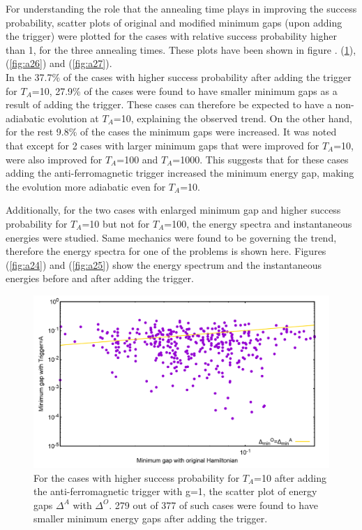 \documentclass[../main.tex]{subfiles}
\begin{document}
For understanding the role that the annealing time plays in improving the success probability, scatter plots of original and modified minimum gaps (upon adding the trigger) were plotted for the cases with relative success probability higher than 1, for the three annealing times. These plots have been shown in figure .
(\ref{fig:a23}), (\ref{fig:a26}) and (\ref{fig:a27}).\\

In the 37.7\% of the cases with higher success probability after adding the trigger for $T_A$=10, 27.9\% of the cases were found to have smaller minimum gaps as a result of adding the trigger. These cases can therefore be expected to have a non-adiabatic evolution at $T_A$=10, explaining the observed trend. On the other hand, for the rest 9.8\% of the cases the minimum gaps were increased. It was noted that except for 2 cases with larger minimum gaps that were improved for $T_A$=10, were also improved for $T_A$=100 and $T_A$=1000. This suggests that for these cases adding the anti-ferromagnetic trigger increased the minimum energy gap, making the evolution more adiabatic even for $T_A$=10. 

Additionally, for the two cases with enlarged minimum gap and higher success probability for $T_A$=10 but not for $T_A$=100, the energy spectra and instantaneous energies were studied. Same mechanics were found to be governing the trend, therefore the energy spectra for one of the problems is shown here. Figures (\ref{fig:a24}) and (\ref{fig:a25}) show the energy spectrum and the instantaneous energies before and after adding the trigger.

\begin{figure}[H]
\centering 
\includegraphics[scale=0.26]{selected_T10_g1.png}
\caption{For the cases with higher success probability for $T_A$=10 after adding the anti-ferromagnetic trigger with g=1, the scatter plot of energy gaps $\Delta^A $ with $\Delta^O$. 279 out of 377 of such cases were found to have smaller minimum energy gaps after adding the trigger.}
\label{fig:a23}
\end{figure}
\end{document}
